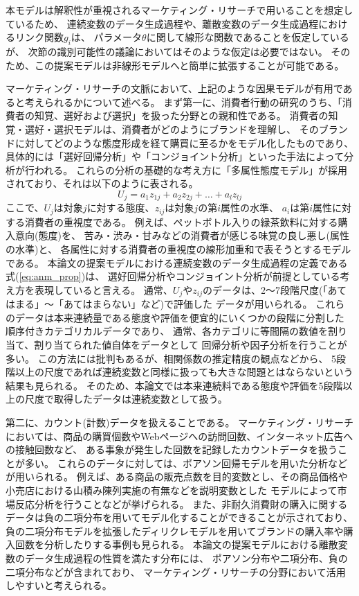 本モデルは解釈性が重視されるマーケティング・リサーチで用いることを想定しているため、
連続変数のデータ生成過程や、離散変数のデータ生成過程におけるリンク関数$g_i$は、
パラメータ$\theta$に関して線形な関数であることを仮定しているが、
次節の識別可能性の議論においてはそのような仮定は必要ではない。
そのため、この提案モデルは非線形モデルへと簡単に拡張することが可能である。

マーケティング・リサーチの文脈において、上記のような因果モデルが有用であると考えられるかについて述べる。
まず第一に、消費者行動の研究のうち、「消費者の知覚、選好および選択」を扱った分野との親和性である。
消費者の知覚・選好・選択モデルは、消費者がどのようにブランドを理解し、
そのブランドに対してどのような態度形成を経て購買に至るかをモデル化したものであり、
具体的には「選好回帰分析」や「コンジョイント分析」といった手法によって分析が行われる\cite{1987-vg}。
これらの分析の基礎的な考え方に「多属性態度モデル」が採用されており、それは以下のように表される。
\begin{equation*}
  U_j = a_1 z_{1j} + a_2 z_{2j} + \dots + a_l z_{lj}
\end{equation*}
ここで、$U_j$は対象$j$に対する態度、$z_{ij}$は対象$j$の第$i$属性の水準、
$a_i$は第$i$属性に対する消費者の重視度である。
例えば、ペットボトル入りの緑茶飲料に対する購入意向(態度)を、
苦み・渋み・甘みなどの消費者が感じる味覚の良し悪し(属性の水準)と、
各属性に対する消費者の重視度の線形加重和で表そうとするモデルである。
本論文の提案モデルにおける連続変数のデータ生成過程の定義である式(\ref{eq:anm_prop})は、
選好回帰分析やコンジョイント分析が前提としている考え方を表現していると言える。
通常、$U_j$や$z_{ij}$のデータは、2〜7段階尺度(「あてはまる」〜「あてはまらない」など)で評価した
データが用いられる\cite{1987-vg}\cite{2018-ci}。
これらのデータは本来連続量である態度や評価を便宜的にいくつかの段階に分割した
順序付きカテゴリカルデータであり、
通常、各カテゴリに等間隔の数値を割り当て、割り当てられた値自体をデータとして
回帰分析や因子分析を行うことが多い。
この方法には批判もあるが、相関係数の推定精度の観点などから、
5段階以上の尺度であれば連続変数と同様に扱っても大きな問題とはならないという結果も見られる\cite{1996-bs}。
そのため、本論文では本来連続料である態度や評価を5段階以上の尺度で取得したデータは連続変数として扱う。

第二に、カウント(計数)データを扱えることである。
マーケティング・リサーチにおいては、商品の購買個数やWebページへの訪問回数、インターネット広告への接触回数など、
ある事象が発生した回数を記録したカウントデータを扱うことが多い。
これらのデータに対しては、ポアソン回帰モデルを用いた分析などが用いられる。
例えば、ある商品の販売点数を目的変数とし、その商品価格や小売店における山積み陳列実施の有無などを説明変数とした
モデルによって市場反応分析を行うことなどが挙げられる\cite{2015-pb}。
また、非耐久消費財の購入に関するデータは負の二項分布を用いてモデル化することができることが示されており\cite{Ehrenberg1959-ei}、
負の二項分布モデルを拡張したディリクレモデルを用いてブランドの購入率や購入回数を分析したりする事例も見られる\cite{2016-io}。
本論文の提案モデルにおける離散変数のデータ生成過程の性質を満たす分布には、
ポアソン分布や二項分布、負の二項分布などが含まれており、
マーケティング・リサーチの分野において活用しやすいと考えられる。
